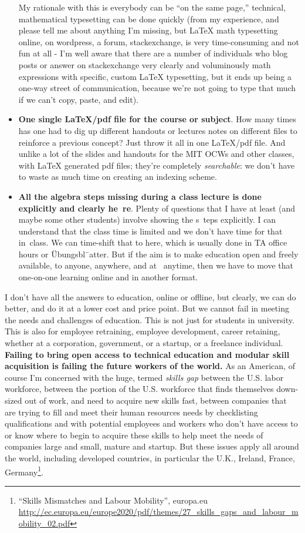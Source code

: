 \documentclass[twoside]{amsart}
\theoremstyle{plain}
\theoremstyle{definition}
\theoremstyle{remark}
\numberwithin{equation}{section}
\begin{document}
\begin{itemize}
My rationale with this is everybody can be ``on the same page,'' technical, mathematical typesetting can be done quickly (from my experience, and please tell me about anything I'm missing, but LaTeX math typesetting online, on wordpress, a forum, stackexchange, is very time-consuming and not fun at all - I'm well aware that there are a number of  individuals who blog posts or answer on stackexchange very clearly and voluminously math expressions with specific, custom LaTeX typesetting, but it ends up being a one-way street of communication, because we're not going to type that much if we can't copy, paste, and edit).  
\item \textbf{One single LaTeX/pdf file for the course or subject}.  How many times has one had to dig up different handouts or lectures notes on different files to reinforce a previous concept?  Just throw it all in one LaTeX/pdf file.  And unlike a lot of the slides and handouts for the MIT OCWs and other classes, with LaTeX generated pdf files; they're completely \emph{searchable}: we don't have to waste as much time on creating an indexing scheme.
\item \textbf{All the algebra steps missing during a class lecture is done explicitly and clearly he\
re}.  Plenty of	questions that I have at least (and maybe some other students) involve showing the s\
teps explicitly.  I can	understand that	the class time is limited and we don't have time for that in\
 class.	 We can	time-shift that	to here, which is usually done in TA office hours or \"{U}bungsbl\"{\
a}tter.	 But if	the aim	is to make education open and freely available,	to anyone, anywhere, and at \
anytime, then we have to move that one-on-one learning online and in another format.
\end{itemize}

I don't have all the answers to education, online or offline, but clearly, we can do better, and do it at a lower cost and price point.  But we cannot fail in meeting the needs and challenges of education.  This is not just for students in university. This is also for employee retraining, employee development, career retaining, whether at a corporation, government, or a startup, or a freelance individual. \textbf{Failing to bring open access to technical education and modular skill acquisition is failing the future workers of the world.}  As an American, of course I'm concerned with the huge, termed \emph{skills gap} between the U.S. labor workforce, between the portion of the U.S. workforce that finds themselves down-sized out of work, and need to acquire new skills fast, between companies that are trying to fill and meet their human resources needs by checklisting qualifications and with potential employees and workers who don't have access to or know where to begin to acquire these skills to help meet the needs of companies large and small, mature and startup.  But these issues apply all around the world, including developed countries, in particular the U.K., Ireland, France, Germany\footnote{``Skills Mismatches and Labour Mobility'', europa.eu \url{http://ec.europa.eu/europe2020/pdf/themes/27_skills_gaps_and_labour_mobility_02.pdf}}.   
\end{document}
